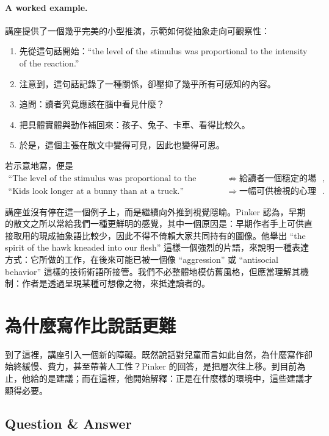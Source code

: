 \paragraph{A worked example.}
講座提供了一個幾乎完美的小型推演，示範如何從抽象走向可觀察性：
\begin{enumerate}
\item 先從這句話開始：``the level of the stimulus was proportional to the intensity of the reaction.''
\item 注意到，這句話記錄了一種關係，卻壓抑了幾乎所有可感知的內容。
\item 追問：讀者究竟應該在腦中看見什麼？
\item 把具體實體與動作補回來：孩子、兔子、卡車、看得比較久。
\item 於是，這個主張在散文中變得可見，因此也變得可思。
\end{enumerate}

若示意地寫，便是
\begin{align}
\text{``The level of the stimulus was proportional to the intensity of the reaction.''}
&\not\Rightarrow \text{給讀者一個穩定的場景}, \\
\text{``Kids look longer at a bunny than at a truck.''}
&\Rightarrow \text{一幅可供檢視的心理圖像}.
\end{align}

講座並沒有停在這一個例子上，而是繼續向外推到視覺隱喻。Pinker 認為，早期的散文之所以常給我們一種更鮮明的感覺，其中一個原因是：早期作者手上可供直接取用的現成抽象語比較少，因此不得不倚賴大家共同持有的圖像。他舉出 ``the spirit of the hawk kneaded into our flesh'' 這樣一個強烈的片語，來說明一種表達方式：它所做的工作，在後來可能已被一個像 ``aggression'' 或 ``antisocial behavior'' 這樣的技術術語所接管。我們不必整體地模仿舊風格，但應當理解其機制：作者是透過呈現某種可想像之物，來抵達讀者的。

\section{為什麼寫作比說話更難}

到了這裡，講座引入一個新的障礙。既然說話對兒童而言如此自然，為什麼寫作卻始終緩慢、費力，甚至帶著人工性？Pinker 的回答，是把層次往上移。到目前為止，他給的是建議；而在這裡，他開始解釋：正是在什麼樣的環境中，這些建議才顯得必要。

\subsection{Question \& Answer}

